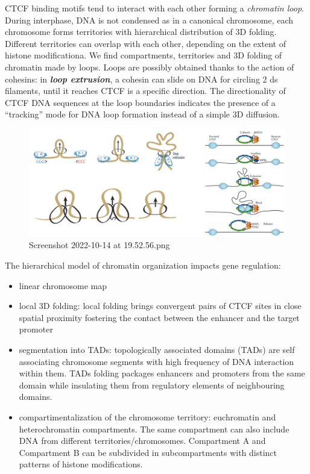 CTCF binding motifs tend to interact with each other forming a \emph{chromatin loop}. During interphase, DNA is not condensed as in a canonical chromosome, each chromosome forms territories with hierarchical distribution of 3D folding. Different territories can overlap with each other, depending on the extent of histone modificationa. We find compartments, territories and 3D folding of chromatin made by loops. Loops are possibly obtained thanks to the action of cohesins: in \textbf{\emph{loop extrusion}}, a cohesin can slide on DNA for circling 2 ds filaments, until it reaches CTCF is a specific direction. The directionality of CTCF DNA sequences at the loop boundaries indicates the presence of a ``tracking'' mode for DNA loop formation instead of a simple 3D diffusion.

\begin{figure}
\centering
\includegraphics[width=\textwidth]{../_resources/Screenshot_2022-10-14_at_19-52-56.png}
\caption{Screenshot 2022-10-14 at 19.52.56.png}
\end{figure}

The hierarchical model of chromatin organization impacts gene regulation:

\begin{itemize}
\tightlist
\item
  linear chromosome map
\item
  local 3D folding: local folding brings convergent pairs of CTCF sites in close spatial proximity fostering the contact between the enhancer and the target promoter
\item
  segmentation into TADs: topologically associated domains (TADs) are self associating chromosome segments with high frequency of DNA interaction within them. TADs folding packages enhancers and promoters from the same domain while insulating them from regulatory elements of neighbouring domains.
\item
  compartimentalization of the chromosome territory: euchromatin and heterochromatin compartments. The same compartment can also include DNA from different territories/chromosomes. Compartment A and Compartment B can be subdivided in subcompartments with distinct patterns of histone modifications.
\end{itemize}

